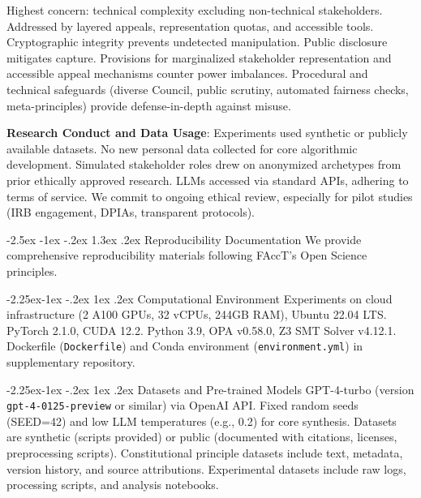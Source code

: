 \documentclass[manuscript,screen,9pt]{acmart}
\makeatletter
\renewcommand\section{\@startsection{section}{1}{\z@}%
  {-2.5ex \@plus -1ex \@minus -.2ex}%
  {1.3ex \@plus.2ex}%
  {\normalfont\Large\bfseries}}
\renewcommand\subsection{\@startsection{subsection}{2}{\z@}%
  {-2.25ex\@plus -1ex \@minus -.2ex}%
  {1ex \@plus .2ex}%
  {\normalfont\large\bfseries}}
\makeatother
\begin{document}
\begin{table}[!htb]
\begin{table}[htbp]
\end{table}
Highest concern: technical complexity excluding non-technical stakeholders. Addressed by layered appeals, representation quotas, and accessible tools. Cryptographic integrity prevents undetected manipulation. Public disclosure mitigates capture. Provisions for marginalized stakeholder representation and accessible appeal mechanisms counter power imbalances. Procedural and technical safeguards (diverse Council, public scrutiny, automated fairness checks, meta-principles) provide defense-in-depth against misuse.

\textbf{Research Conduct and Data Usage}:
Experiments used synthetic or publicly available datasets. No new personal data collected for core algorithmic development. Simulated stakeholder roles drew on anonymized archetypes from prior ethically approved research. LLMs accessed via standard APIs, adhering to terms of service. We commit to ongoing ethical review, especially for pilot studies (IRB engagement, DPIAs, transparent protocols).

\section{Reproducibility Documentation}
\label{app:reproducibility}
We provide comprehensive reproducibility materials following FAccT's Open Science principles.

\subsection{Computational Environment}
Experiments on cloud infrastructure (2 A100 GPUs, 32 vCPUs, 244GB RAM), Ubuntu 22.04 LTS. PyTorch 2.1.0, CUDA 12.2. Python 3.9, OPA v0.58.0, Z3 SMT Solver v4.12.1. Dockerfile (\texttt{Dockerfile}) and Conda environment (\texttt{environment.yml}) in supplementary repository.

\subsection{Datasets and Pre-trained Models}
GPT-4-turbo (version \texttt{gpt-4-0125-preview} or similar) via OpenAI API. Fixed random seeds (SEED=42) and low LLM temperatures (e.g., 0.2) for core synthesis. Datasets are synthetic (scripts provided) or public (documented with citations, licenses, preprocessing scripts). Constitutional principle datasets include text, metadata, version history, and source attributions. Experimental datasets include raw logs, processing scripts, and analysis notebooks.


\end{table}
\end{document}
